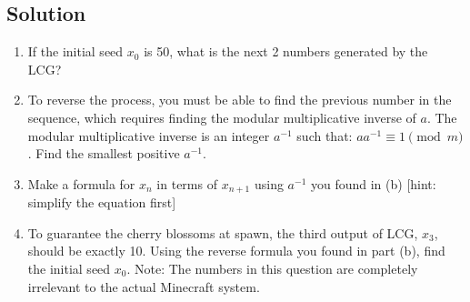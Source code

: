 \documentclass[11pt]{article}
\begin{document}
    \subsection*{Solution}
    \begin{enumerate}[label=(\alph*)]
        \item If the initial seed $x_0$ is 50, what is the next 2 numbers generated by the LCG?
        \item To reverse the process, you must be able to find the previous number in the sequence, which requires finding the modular multiplicative inverse of $a$. The modular multiplicative inverse is an integer $a^{-1}$ such that: $aa^{-1} \equiv 1 \pmod{m}$. Find the smallest positive $a^{-1}$.
        \item Make a formula for $x_n$ in terms of $x_{n+1}$ using $a^{-1}$ you found in (b) [hint: simplify the equation first]
        \item To guarantee the cherry blossoms at spawn, the third output of LCG, $x_3$, should be exactly 10. Using the reverse formula you found in part (b), find the initial seed $x_0$. Note: The numbers in this question are completely irrelevant to the actual Minecraft system.
    \end{enumerate}
\end{document}

